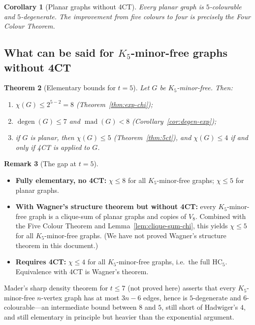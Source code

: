\documentclass[11pt]{article}
\newtheorem{theorem}{Theorem}[section]
\newtheorem{corollary}[theorem]{Corollary}
\theoremstyle{definition}
\newtheorem{remark}[theorem]{Remark}
\newcommand{\degen}{\operatorname{degen}}
\newcommand{\mad}{\operatorname{mad}}
\begin{document}
\begin{corollary}[Planar graphs without 4CT]\label{cor:planar-no4ct}
Every planar graph is \(5\)-colourable and \(5\)-degenerate. The improvement from
five colours to four is precisely the Four Colour Theorem.
\end{corollary}

\subsection{What can be said for \(K_5\)-minor-free graphs without 4CT}

\begin{theorem}[Elementary bounds for \(t=5\)]\label{thm:t5-elem}
Let \(G\) be \(K_5\)-minor-free. Then:
\begin{enumerate}
\item \(\chi(G)\le 2^{5-2}=8\) (Theorem~\ref{thm:exp-chi});
\item \(\degen(G)\le 7\) and \(\mad(G)<8\) (Corollary~\ref{cor:degen-exp});
\item if \(G\) is planar, then \(\chi(G)\le 5\) (Theorem~\ref{thm:5ct}), and
\(\chi(G)\le 4\) if and only if 4CT is applied to \(G\).
\end{enumerate}
\end{theorem}

\begin{remark}[The gap at \(t=5\)]
\begin{itemize}
\item \textbf{Fully elementary, no 4CT:} \(\chi\le 8\) for all \(K_5\)-minor-free
graphs; \(\chi\le 5\) for planar graphs.
\item \textbf{With Wagner's structure theorem but without 4CT:} every
\(K_5\)-minor-free graph is a clique-sum of planar graphs and copies of
\(V_8\). Combined with the Five Colour Theorem and Lemma~\ref{lem:clique-sum-chi},
this yields \(\chi\le 5\) for all \(K_5\)-minor-free graphs. (We have not proved
Wagner's structure theorem in this document.)
\item \textbf{Requires 4CT:} \(\chi\le 4\) for all \(K_5\)-minor-free graphs, i.e.\
the full \(\mathrm{HC}_5\). Equivalence with 4CT is Wagner's theorem.
\end{itemize}
Mader's sharp density theorem for \(t\le 7\) (not proved here) asserts that every
\(K_5\)-minor-free \(n\)-vertex graph has at most \(3n-6\) edges, hence is
\(5\)-degenerate and \(6\)-colourable---an intermediate bound between \(8\) and
\(5\), still short of Hadwiger's \(4\), and still elementary in principle but
heavier than the exponential argument.
\end{remark}
\end{document}
